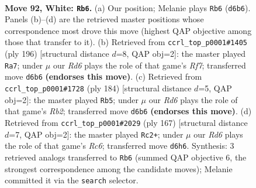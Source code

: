 \documentclass[11pt]{article}
\begin{document}
\clearpage

\begin{figure}[p]\centering
\begin{subfigure}{0.46\textwidth}\centering
\resizebox{\linewidth}{!}{%
\newchessgame
\chessboard[
  setfen={5r1k/P7/3R4/8/8/6K1/8/8 w - - 53 92},
  showmover=false,
  pgfstyle=straightmove, color=movearrow, markmove={d6-b6}
]}
\caption{}
\end{subfigure}\hfill
\begin{subfigure}{0.46\textwidth}\centering
\resizebox{\linewidth}{!}{%
\newchessgame
\chessboard[
  setfen={8/5R2/5p1k/5P2/7r/5K2/8/8 w - - 10 99},
  showmover=false,
  pgfstyle=straightmove, color=movearrow, markmove={f7-a7}
]}
\caption{}
\end{subfigure}
\\[4pt]
\begin{subfigure}{0.46\textwidth}\centering
\resizebox{\linewidth}{!}{%
\newchessgame
\chessboard[
  setfen={5r2/8/2K2k2/8/2p3P1/8/1R6/8 w - - 9 93},
  showmover=false,
  pgfstyle=straightmove, color=movearrow, markmove={b2-b5}
]}
\caption{}
\end{subfigure}\hfill
\begin{subfigure}{0.46\textwidth}\centering
\resizebox{\linewidth}{!}{%
\newchessgame
\chessboard[
  setfen={8/7p/5k2/8/6RP/2r5/6K1/8 b - - 6 84},
  showmover=false,
  pgfstyle=straightmove, color=movearrow, markmove={c3-c2}
]}
\caption{}
\end{subfigure}
\caption{\textbf{Move 92, White: \texttt{Rb6}.} (a) Our position; Melanie plays \texttt{Rb6} (\texttt{d6b6}). Panels (b)--(d) are the retrieved master positions whose correspondence most drove this move (highest QAP objective among those that transfer to it). (b) Retrieved from \texttt{ccrl\_top\_p0001\#1405} (ply 196) [structural distance $d$=8, QAP obj=2]: the master played \texttt{Ra7}; under $\mu$ our \emph{Rd6} plays the role of that game's \emph{Rf7}; transferred move \texttt{d6b6} \textbf{(endorses this move)}. (c) Retrieved from \texttt{ccrl\_top\_p0001\#1728} (ply 184) [structural distance $d$=5, QAP obj=2]: the master played \texttt{Rb5}; under $\mu$ our \emph{Rd6} plays the role of that game's \emph{Rb2}; transferred move \texttt{d6b6} \textbf{(endorses this move)}. (d) Retrieved from \texttt{ccrl\_top\_p0001\#2029} (ply 167) [structural distance $d$=7, QAP obj=2]: the master played \texttt{Rc2+}; under $\mu$ our \emph{Rd6} plays the role of that game's \emph{Rc6}; transferred move \texttt{d6h6}. Synthesis: 3 retrieved analogs transferred to \texttt{Rb6} (summed QAP objective 6, the strongest correspondence among the candidate moves); Melanie committed it via the \texttt{search} selector.}
\label{fig:thought-m182}
\end{figure}
\end{document}
